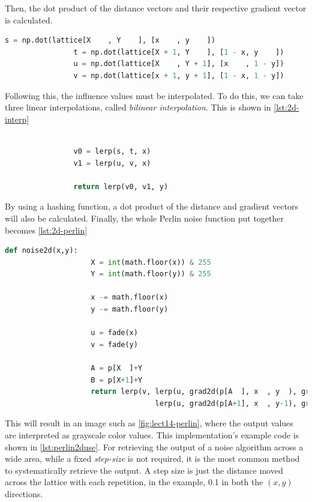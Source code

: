\documentclass[10pt]{report}
\begin{document}
			Then, the dot product of the distance vectors and their respective gradient vector is calculated. 
			
			\begin{lstlisting}[label={lst:2d-infl}, language=Python, frame=none, caption={Calculating the influence values for two-dimensions.}, captionpos=b]
				s = np.dot(lattice[X    , Y    ], [x    , y    ])
				t = np.dot(lattice[X + 1, Y    ], [1 - x, y    ])
				u = np.dot(lattice[X    , Y + 1], [x    , 1 - y])
				v = np.dot(lattice[x + 1, y + 1], [1 - x, 1 - y])
			\end{lstlisting}
		
			Following this, the influence values must be interpolated. To do this, we can take three linear interpolations, called \emph{bilinear interpolation}. This is shown in \autoref{lst:2d-interp}
			
			\begin{lstlisting}[label={lst:2d-interp}, language=Python, frame=none, caption={Calculating the interpolated final value.}, captionpos=b]
				
				v0 = lerp(s, t, x)
				v1 = lerp(u, v, x)
				
				return lerp(v0, v1, y)
			\end{lstlisting}
		
			By using a hashing function, a dot product of the distance and gradient vectors will also be calculated. Finally, the whole Perlin noise function put together becomes \autoref{lst:2d-perlin}
		
			\begin{lstlisting}[label={lst:2d-perlin}, language=Python, frame=none, caption={Two-dimensional Perlin noise.}, captionpos=b]
				def noise2d(x,y):
					X = int(math.floor(x)) & 255   
					Y = int(math.floor(y)) & 255  
					
					x -= math.floor(x)
					y -= math.floor(y)
					
					u = fade(x)
					v = fade(y)
					
					A = p[X  ]+Y
					B = p[X+1]+Y
					return lerp(v, lerp(u, grad2d(p[A  ], x  , y  ), grad2d(p[B  ], x-1, y  )),
								   lerp(u, grad2d(p[A+1], x  , y-1), grad2d(p[B+1], x-1, y-1)))
			\end{lstlisting}
		
			This will result in an image such as \autoref{fig:lect14-perlin}, where the output values are interpreted as grayscale color values. This implementation's example code is shown in \autoref{lst:perlin2duse}. For retrieving the output of a noise algorithm across a wide area, while a fixed \emph{step-size} is not required, it is the most common method to systematically retrieve the output. A step size is just the distance moved across the lattice with each repetition, in the example, 0.1 in both the \((x,y)\) directions.
			
\end{document}
